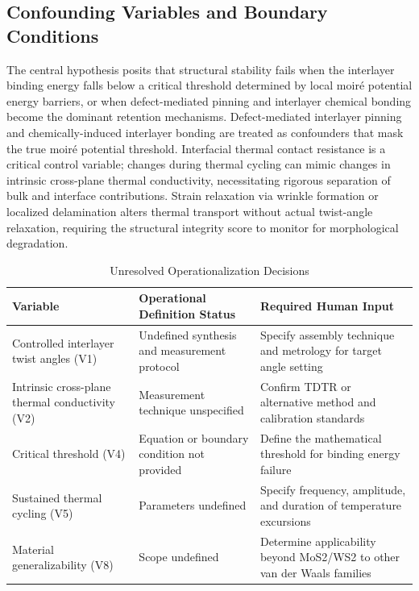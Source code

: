 \documentclass[conference]{IEEEtran}
\begin{document}
\subsection{Confounding Variables and Boundary Conditions}
The central hypothesis posits that structural stability fails when the interlayer binding energy falls below a critical threshold determined by local moiré potential energy barriers, or when defect-mediated pinning and interlayer chemical bonding become the dominant retention mechanisms. Defect-mediated interlayer pinning and chemically-induced interlayer bonding are treated as confounders that mask the true moiré potential threshold. Interfacial thermal contact resistance is a critical control variable; changes during thermal cycling can mimic changes in intrinsic cross-plane thermal conductivity, necessitating rigorous separation of bulk and interface contributions. Strain relaxation via wrinkle formation or localized delamination alters thermal transport without actual twist-angle relaxation, requiring the structural integrity score to monitor for morphological degradation.

\begin{table}[htbp]
\centering
\footnotesize
\setlength{\tabcolsep}{3pt}
\renewcommand{\arraystretch}{1.12}
\caption{Unresolved Operationalization Decisions}
\label{tab:appendix-variables-and-definitions-b3}
\begin{tabular}{|p{}|p{}|p{}|}
\hline
Variable & Operational Definition Status & Required Human Input \\\hline
Controlled interlayer twist angles (V1) & Undefined synthesis and measurement protocol & Specify assembly technique and metrology for target angle setting \\\hline
Intrinsic cross-plane thermal conductivity (V2) & Measurement technique unspecified & Confirm TDTR or alternative method and calibration standards \\\hline
Critical threshold (V4) & Equation or boundary condition not provided & Define the mathematical threshold for binding energy failure \\\hline
Sustained thermal cycling (V5) & Parameters undefined & Specify frequency, amplitude, and duration of temperature excursions \\\hline
Material generalizability (V8) & Scope undefined & Determine applicability beyond MoS2/WS2 to other van der Waals families \\\hline
\end{tabular}
\end{table}
\end{document}
